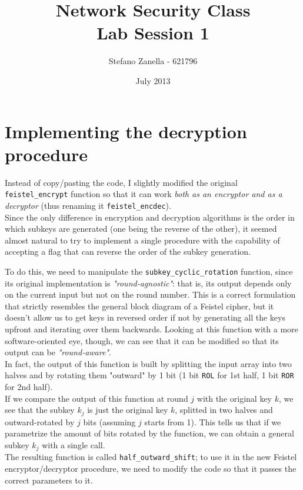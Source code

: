 \documentclass[a4paper,12pt,titlepage]{article}
\begin{document}
\title{Network Security Class \\ Lab Session 1}
\author{Stefano Zanella - 621796}
\date{July 2013}

\maketitle

\section{Implementing the decryption procedure}
Instead of copy/pasting the code, I slightly modified the original
\texttt{feistel\_encrypt} function so that it can work 
\emph{both as an encryptor and as a decryptor} (thus renaming it 
\texttt{feistel\_encdec}). \\
Since the only difference in encryption and decryption algorithms is the order
in which subkeys are generated (one being the reverse of the other), it
seemed almost natural to try to implement a single procedure with the
capability of accepting a flag that can reverse the order of the subkey
generation.

To do this, we need to manipulate the \texttt{subkey\_cyclic\_rotation} function, since
its original implementation is \emph{"round-agnostic"}: that is, its output depends
only on the current input but not on the round number. This is a correct
formulation that strictly resembles the general block diagram of a Feistel
cipher, but it doesn't allow us to get keys in reversed order if not by
generating all the keys upfront and iterating over them backwards. Looking at this
function with a more software-oriented eye, though, we can see that it can be
modified so that its output can be \emph{"round-aware"}. \\
In fact, the output of this function is built by splitting the
input array into two halves and by rotating them "outward" by 1 bit (1 bit
\texttt{ROL} for 1st half, 1 bit \texttt{ROR} for 2nd half). \\
If we compare the output of this function at round $j$ with the
original key $k$,
we see that the subkey $k_j$ is just the original key $k$, splitted in two halves
and outward-rotated by $j$ bits (assuming $j$ starts from 1).
This tells us that if we parametrize the amount of bits rotated by the 
function, we can obtain a general subkey $k_j$ with a single call. \\
The resulting function is called \texttt{half\_outward\_shift}; to use it in the
new Feistel encryptor/decryptor procedure, we need to modify the code so that
it passes the correct parameters to it.
\end{document}
